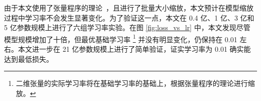 由于本文使用了张量程序的理论~\citep{yang2022tensor, yang2023tensor}，且进行了批量大小缩放，本文预计在模型缩放过程中学习率不会发生显著变化。为了验证这一点，本文在 0.4 亿、1 亿、3 亿和 5 亿参数规模上进行了六组学习率实验。在图 \ref {fig:loss_vs_lr} 中，本文发现尽管模型规模增加了十倍，但最优基础学习率 \footnote{二维张量的实际学习率将在基础学习率的基础上，根据张量程序的理论进行缩放。} 并没有明显变化，仍保持在 0.01 左右。本文进一步在 21 亿参数规模上进行了简单验证，证实学习率为 0.01 确实能达到最低损失。

\clearpage


